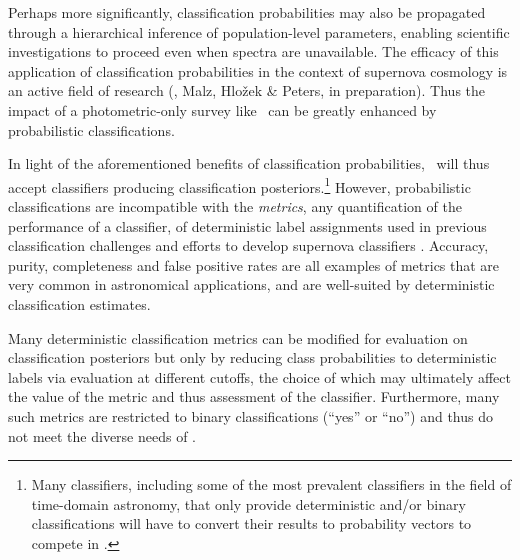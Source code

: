 Perhaps more significantly, classification probabilities may also be propagated through a hierarchical inference of population-level parameters, enabling scientific investigations to proceed even when spectra are unavailable.
The efficacy of this application of classification probabilities in the context of supernova cosmology is an active field of research (\citet{roberts_zbeams:_2017}, Malz, Hlo\v{z}ek \& Peters, in preparation).
Thus the impact of a photometric-only survey like \lsst\ can be greatly enhanced by probabilistic classifications.

In light of the aforementioned benefits of classification probabilities, \plasticc\ will thus accept classifiers producing classification posteriors.\footnote{Many classifiers, including some of the most prevalent classifiers in the field of time-domain astronomy, that only provide deterministic and/or binary classifications will have to convert their results to probability vectors to compete in \plasticc.}
However, probabilistic classifications are incompatible with the \textit{metrics}, any quantification of the performance of a classifier, of deterministic label assignments used in previous classification challenges \citep{kessler_supernova_2010, kessler_results_2010} and efforts to develop supernova classifiers \citep{narayan_machine_2018}.
Accuracy, purity, completeness and false positive rates are all examples of metrics that are very common in astronomical applications, and are well-suited by deterministic classification estimates.

Many deterministic classification metrics can be modified for evaluation on classification posteriors \citep{lochner_photometric_2016, moller_photometric_2016, hon_deep_2017, hon_detecting_2018, gieseke_detecting_2010} but only by reducing class probabilities to deterministic labels via evaluation at different cutoffs, the choice of which may ultimately affect the value of the metric and thus assessment of the classifier.
Furthermore, many such metrics are restricted to binary classifications (``yes'' or ``no'') and thus do not meet the diverse needs of \plasticc.

